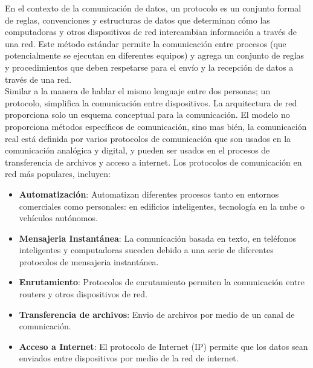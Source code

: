 En el contexto de la comunicación de datos, un protocolo es un conjunto formal de reglas, convenciones y estructuras de datos que determinan cómo las computadoras y otros dispositivos de red intercambian información a través de una red. Este método estándar permite la comunicación entre procesos (que potencialmente se ejecutan en diferentes equipos) y agrega un conjunto de reglas y procedimientos que deben respetarse para el envío y la recepción de datos a través de una red.\\

Similar a la manera de hablar el mismo lenguaje entre dos personas; un protocolo, simplifica la comunicación entre dispositivos. La arquitectura de red proporciona solo un esquema conceptual para la comunicación. El modelo no proporciona métodos específicos de comunicación, sino mas bién, la comunicación real está definida por varios protocolos de comunicación que son usados en la comunicación analógica y digital, y pueden ser usados en el procesos de transferencia de archivos y acceso a internet. Los protocolos de comunicación en red más populares, incluyen:

\begin{itemize}
    \item \textbf{Automatización}: Automatizan diferentes procesos tanto en entornos comerciales como personales: en edificios inteligentes, tecnología en la nube o vehículos autónomos.
    \item \textbf{Mensajeria Instantánea}: La comunicación basada en texto, en teléfonos inteligentes y computadoras suceden debido a una serie de diferentes protocolos de mensajeria instantánea.
    \item \textbf{Enrutamiento}: Protocolos de enrutamiento permiten la comunicación entre routers y otros dispositivos de red.
    \item \textbf{Transferencia de archivos}: Envio de archivos por medio de un canal de comunicación.
    \item \textbf{Acceso a Internet}: El protocolo de Internet (IP) permite que los datos sean enviados entre dispositivos por medio de la red de internet.
\end{itemize}

